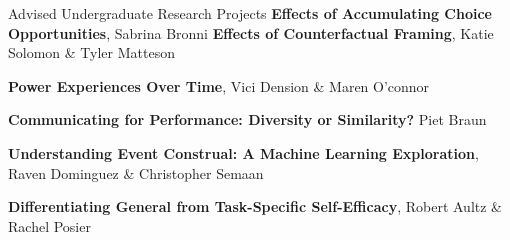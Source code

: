 \begin{rubric}{Advised Undergraduate Research Projects}
\entry*[2017a] \textbf{Effects of Accumulating Choice Opportunities}, Sabrina Bronni
%
\entry*[2017b] \textbf{Effects of Counterfactual Framing}, Katie Solomon \& Tyler Matteson

\entry*[2017c] \textbf{Power Experiences Over Time}, Vici Dension \& Maren O'connor

\entry*[2017d] \textbf{Communicating for Performance: Diversity or Similarity?} Piet Braun

\entry*[2017e] \textbf{Understanding Event Construal: A Machine Learning Exploration}, Raven Dominguez \& Christopher Semaan

\entry*[2017f] \textbf{Differentiating General from Task-Specific Self-Efficacy}, Robert Aultz \& Rachel Posier


\end{rubric}